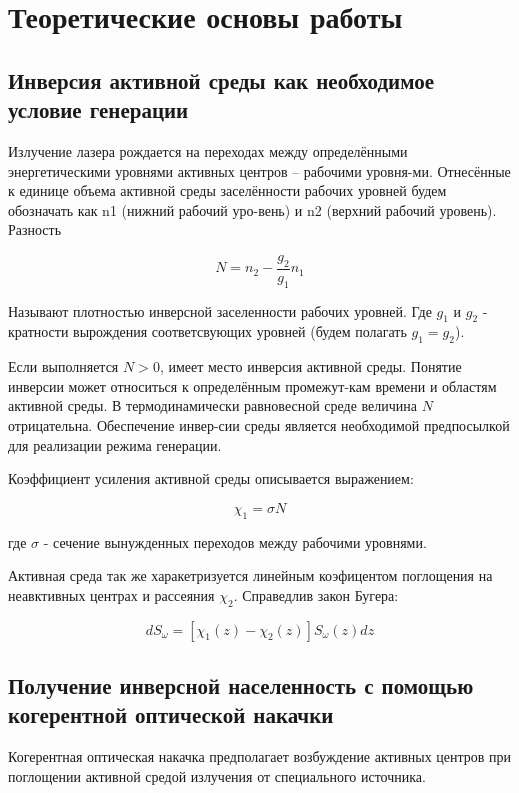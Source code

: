 \documentclass[a4paper]{article}
\begin{document}
\section{Теоретические основы работы}
\subsection{Инверсия активной среды как необходимое условие генерации}

Излучение лазера рождается на переходах между определёнными энергетическими уровнями активных центров – рабочими уровня-ми. Отнесённые к единице объема активной среды заселённости рабочих уровней будем обозначать как n1 (нижний рабочий уро-вень) и n2 (верхний рабочий уровень). Разность

\begin{equation*}
N = n_2 - \frac{g_2}{g_1}n_1
\end{equation*}

Называют плотностью инверсной заселенности рабочих уровней. Где $g_1$ и $g_2$ - кратности вырождения соответсвующих уровней (будем полагать $g_1 = g_2$).
\par
Если выполняется $N>0$, имеет место инверсия активной среды. Понятие инверсии может относиться к определённым промежут-кам времени и областям активной среды. В термодинамически равновесной среде величина $N$ отрицательна. Обеспечение инвер-сии среды является необходимой предпосылкой для реализации режима генерации.

Коэффициент усиления активной среды описывается выражением:

\begin{equation*}
\chi_1 = \sigma N
\end{equation*}

где $\sigma$ - сечение вынужденных переходов между рабочими уровнями.

Активная среда так же харакетризуется линейным коэфицентом поглощения на неавктивных центрах и рассеяния $\chi_2$. Справедлив закон Бугера:

\begin{equation*}
dS_{\omega} = [\chi_1(z)-\chi_2(z)] S_{\omega}(z)dz
\end{equation*}

\subsection{Получение инверсной населенность с помощью когерентной оптической накачки}
Когерентная оптическая накачка предполагает возбуждение активных центров при поглощении активной средой излучения от специального источника.
\end{document}
